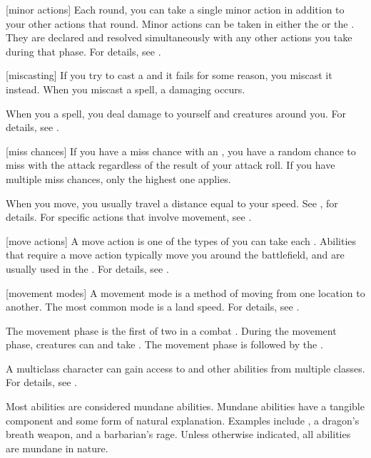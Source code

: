 [minor actions] Each round, you can take a single minor action in addition to your other actions that round.
Minor actions can be taken in either the  or the .
They are declared and resolved simultaneously with any other actions you take during that phase.
For details, see .

[miscasting] If you try to cast a  and it fails for some reason, you miscast it instead.
When you miscast a spell, a damaging  occurs.

 When you  a spell, you deal damage to yourself and creatures around you.
For details, see .

[miss chances] If you have a miss chance with an , you have a random chance to miss with the attack regardless of the result of your attack roll.
If you have multiple miss chances, only the highest one applies.

 When you move, you usually travel a distance equal to your speed.
See , for details.
For specific actions that involve movement, see .

[move actions] A move action is one of the types of  you can take each .
Abilities that require a move action typically move you around the battlefield, and are usually used in the .
For details, see .

[movement modes] A movement mode is a method of moving from one location to another.
The most common mode is a land speed.
For details, see .

 The movement phase is the first of two  in a combat .
During the movement phase, creatures can  and take .
The movement phase is followed by the .

 A multiclass character can gain access to  and other abilities from multiple classes.
For details, see .

 Most abilities are considered mundane abilities.
Mundane abilities have a tangible component and some form of natural explanation.
Examples include , a dragon's breath weapon, and a barbarian's rage.
Unless otherwise indicated, all abilities are mundane in nature.

